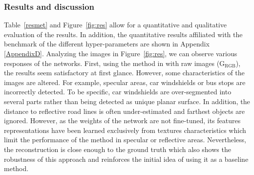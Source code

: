 \subsubsection{Results and discussion} 
Table~\ref{resmet} and Figure~\ref{fig:res} allow for a quantitative and qualitative evaluation of the results. In addition, the quantitative results affiliated with the benchmark of the different hyper-parameters are shown in Appendix \ref{AppendixD}.
Analyzing the images in Figure~\ref{fig:res}, we can observe various responses of the networks.
First, using the method in \cite{godard2019digging} with raw images (G$_{\textrm{RGB}}$), the results seem satisfactory at first glance. However, some characteristics of the images are altered. For example, specular areas, car windshields or bus stops are incorrectly detected. To be specific, car windshields are over-segmented into several parts rather than being detected as unique planar surface.
In addition, the distance to reflective road lines is often under-estimated and farthest objects are ignored.
However, as the weights of the network are not fine-tuned, its features representations have been learned exclusively from textures characteristics which limit the performance of the method in specular or reflective areas. 
Nevertheless, the reconstruction is close enough to the ground truth which also shows the robustness of this approach and reinforces the initial idea of using it as a baseline method.




